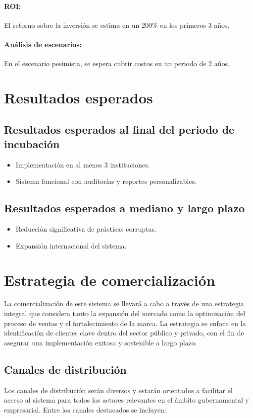 \documentclass[a4paper,12pt]{article}
\begin{document}
\paragraph{ROI:} El retorno sobre la inversión se estima en un 200\% en los primeros 3 años.  
\paragraph{Análisis de escenarios:} En el escenario pesimista, se espera cubrir costos en un periodo de 2 años.

\section{Resultados esperados}
\subsection{Resultados esperados al final del periodo de incubación}
\begin{itemize}
    \item Implementación en al menos 3 instituciones.
    \item Sistema funcional con auditorías y reportes personalizables.
\end{itemize}

\subsection{Resultados esperados a mediano y largo plazo}
\begin{itemize}
    \item Reducción significativa de prácticas corruptas.
    \item Expansión internacional del sistema.
\end{itemize}

\section{Estrategia de comercialización}
La comercialización de este sistema se llevará a cabo a través de una estrategia integral que considera tanto la expansión del mercado como la optimización del proceso de ventas y el fortalecimiento de la marca. La estrategia se enfoca en la identificación de clientes clave dentro del sector público y privado, con el fin de asegurar una implementación exitosa y sostenible a largo plazo.

\subsection{Canales de distribución}
Los canales de distribución serán diversos y estarán orientados a facilitar el acceso al sistema para todos los actores relevantes en el ámbito gubernamental y empresarial. Entre los canales destacados se incluyen:
\end{document}

